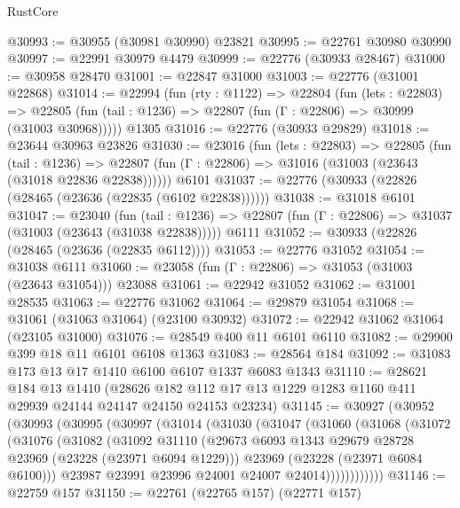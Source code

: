 \begin{lexlean}{RustCore}
\begin{coremodule}
@30993 := @30955 (@30981 @30990) @23821
@30995 := @22761 @30980 @30990
@30997 := @22991 @30979 @4479
@30999 := @22776 (@30933 @28467)
@31000 := @30958 @28470
@31001 := @22847 @31000
@31003 := @22776 (@31001 @22868)
@31014 := @22994
    (fun (rty : @1122) =>
    @22804
      (fun (lets : @22803) =>
      @22805 (fun (tail : @1236) => @22807 (fun (Γ : @22806) => @30999 (@31003 @30968)))))
    @1305
@31016 := @22776 (@30933 @29829)
@31018 := @23644 @30963 @23826
@31030 := @23016
    (fun (lets : @22803) =>
    @22805
      (fun (tail : @1236) =>
      @22807 (fun (Γ : @22806) => @31016 (@31003 (@23643 (@31018 @22836 @22838))))))
    @6101
@31037 := @22776 (@30933 (@22826 (@28465 (@23636 (@22835 (@6102 @22838))))))
@31038 := @31018 @6101
@31047 := @23040
    (fun (tail : @1236) => @22807 (fun (Γ : @22806) => @31037 (@31003 (@23643 (@31038 @22838)))))
    @6111
@31052 := @30933 (@22826 (@28465 (@23636 (@22835 @6112))))
@31053 := @22776 @31052
@31054 := @31038 @6111
@31060 := @23058 (fun (Γ : @22806) => @31053 (@31003 (@23643 @31054))) @23088
@31061 := @22942 @31052
@31062 := @31001 @28535
@31063 := @22776 @31062
@31064 := @29879 @31054
@31068 := @31061 (@31063 @31064) (@23100 @30932)
@31072 := @22942 @31062 @31064 (@23105 @31000)
@31076 := @28549 @400 @11 @6101 @6110
@31082 := @29900 @399 @18 @11 @6101 @6108 @1363
@31083 := @28564 @184
@31092 := @31083 @173 @13 @17 @1410 @6100 @6107 @1337 @6083 @1343
@31110 := @28621
    @184
    @13
    @1410
    (@28626 @182 @112 @17 @13 @1229 @1283 @1160 @411 @29939 @24144 @24147 @24150 @24153 @23234)
@31145 := @30927
    (@30952
      (@30993
        (@30995
          (@30997
            (@31014
              (@31030
                (@31047
                  (@31060
                    (@31068
                      (@31072
                        (@31076
                          (@31082
                            (@31092
                              @31110
                              (@29673
                                @6093
                                @1343
                                @29679
                                @28728
                                @23969
                                (@23228 (@23971 @6094 @1229)))
                              @23969
                              (@23228 (@23971 @6084 @6100)))
                            @23987
                            @23991
                            @23996
                            @24001
                            @24007
                            @24014))))))))))))
@31146 := @22759 @157
@31150 := @22761 (@22765 @157) (@22771 @157)

\end{coremodule}
\end{lexlean}
